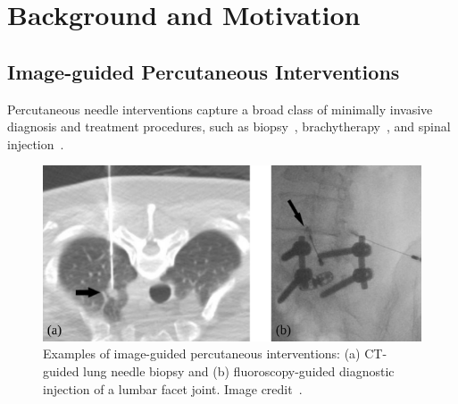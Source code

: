 \chapter{Background and Motivation} \label{chap:chap-1}

\section{Image-guided Percutaneous Interventions}
\label{sec:image-guided-percutanous-interventions}

Percutaneous needle interventions  capture a broad class of minimally invasive diagnosis and treatment procedures, such as biopsy~\parencite{bourgouinImageGuidedPercutaneousLung2021, birginCoreNeedleBiopsy2020, shethSocietyInterventionalRadiology2020, wuComplicationsCTGuidedPercutaneous2011}, brachytherapy~\parencite{chargariBrachytherapyOverviewClinicians2019, ragdeModernProstateBrachytherapy2000, wanBrachytherapyNeedleDeflection2005, podderVivoMotionForce2006}, and spinal injection~\parencite{wonFacetJointInjections2020,manchikantiEpiduralInterventionsManagement2021, carassitiEpiduralSteroidInjections2021, silbergleitImagingguidedInjectionTechniques2001}. 

\begin{figure}[h]
  \centering
  \includegraphics[width=0.68\columnwidth]{figures/medical_images/percutaneous_intervention.png}
  \caption{Examples of image-guided percutaneous interventions: (a) CT-guided lung needle biopsy and (b) fluoroscopy-guided diagnostic injection of a lumbar facet joint. Image credit~\parencite{bourgouinImageGuidedPercutaneousLung2021, fritzManagementChronicLow2007}.}
  \label{fig:chap-2-percutaneous-intervention}
\end{figure}

